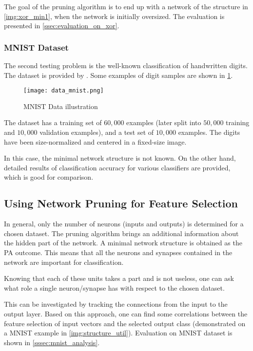 The goal of the pruning algorithm is to end up with a network of the structure in \cref{img:xor_min1}, when the network is initially oversized. The evaluation is presented in \cref{ssec:evaluation_on_xor}.

\subsubsection*{MNIST Dataset}
The second testing problem is the well-known classification of handwritten digits. The dataset is provided by \citep{online:mnist}. Some examples of digit samples are shown in \cref{img:data_mnist}.

\begin{figure}[H]
  \centering
  \texttt{[image: data\_mnist.png]}
  \caption{MNIST Data illustration \citep{online:mnist}}
  \label{img:data_mnist}
\end{figure}

The dataset has a training set of $ 60,000 $ examples (later split into $ 50,000 $ training and $ 10,000 $ validation examples), and a test set of $ 10,000 $ examples. The digits have been size-normalized and centered in a fixed-size image.

In this case, the minimal network structure is not known. On the other hand, detailed results of classification accuracy for various classifiers are provided, which is good for comparison.

\subsection{Using Network Pruning for Feature Selection} \label{ssec:minimal_structure_util}
In general, only the number of neurons (inputs and outputs) is determined for a chosen dataset. The pruning algorithm brings an additional information about the hidden part of the network. A minimal network structure is obtained as the PA outcome. This means that all the neurons and synapses contained in the network are important for classification.

Knowing that each of these units takes a part and is not useless, one can ask what role a single neuron/synapse has with respect to the chosen dataset.

This can be investigated by tracking the connections from the input to the output layer. Based on this approach, one can find some correlations between the feature selection of input vectors and the selected output class (demonstrated on a MNIST example in \cref{img:structure_util}). Evaluation on MNIST dataset is shown in \cref{sssec:mnist_analysis}.

